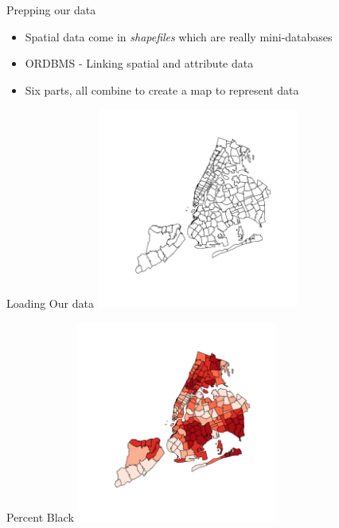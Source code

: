\documentclass[aspectratio = 169, 12pt]{beamer}\usepackage[]{graphicx}\usepackage[]{color}
\newenvironment{knitrout}{}{} %
\begin{document}
\begin{frame}{Prepping our data}
\begin{itemize}
\item Spatial data come in \textit{shapefiles} which are really mini-databases
\item ORDBMS - Linking spatial and attribute data
\item Six parts, all combine to create a map to represent data
\end{itemize}
\end{frame}

\begin{frame}[fragile]{Loading Our data}
\begin{knitrout}\tiny
{}\color{fgcolor}
\includegraphics[width=250px]{figure/unnamed-chunk-1-1} 

\end{knitrout}
\end{frame}

\begin{frame}[fragile]{Percent Black}
\begin{knitrout}\tiny
{}\color{fgcolor}
\includegraphics[width=250px]{figure/unnamed-chunk-2-1} 

\end{knitrout}
\end{frame}
\end{document}
